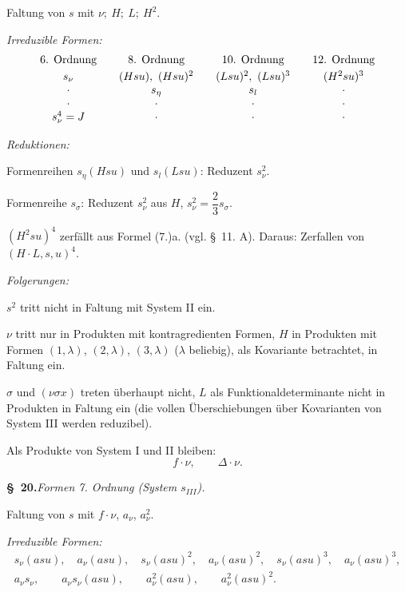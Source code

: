 Faltung von $s$ mit $\nu;\ H;\ L;\ H^2$.

\noindent\emph{Irreduzible Formen:}
\[
\begin{array}{c@{\qquad}c@{\qquad}c@{\qquad}c}
\text{6. Ordnung} & \text{8. Ordnung} & \text{10. Ordnung} & \text{12. Ordnung}\\[0.3em]
s_\nu & (Hsu),\ (Hsu)^2 & (Lsu)^2,\ (Lsu)^3 & (H^2su)^3\\
\cdot & s_\eta & s_l & \cdot\\
\cdot & \cdot & \cdot & \cdot\\
s_\nu^4=J & \cdot & \cdot & \cdot
\end{array}
\]

\noindent\emph{Reduktionen:}

Formenreihen $s_\eta(Hsu)$ und $s_l(Lsu)$: Reduzent $s_\nu^2$.

Formenreihe $s_\sigma$: Reduzent $s_\nu^2$ aus $H$, $s_\nu^2=\dfrac23s_\sigma$.

$(H^2su)^4$ zerfällt aus Formel (7.)a. (vgl. \S\ 11. A). Daraus: Zerfallen von $(H\cdot L,s,u)^4$.

\noindent\emph{Folgerungen:}

$s^2$ tritt nicht in Faltung mit System II ein.

$\nu$ tritt nur in Produkten mit kontragredienten Formen, $H$ in Produkten mit Formen $(1,\lambda)$, $(2,\lambda)$, $(3,\lambda)$ ($\lambda$ beliebig), als Kovariante betrachtet, in Faltung ein.

$\sigma$ und $(\nu\sigma x)$ treten überhaupt nicht, $L$ als Funktionaldeterminante nicht in Produkten in Faltung ein (die vollen Überschiebungen über Kovarianten von System III werden reduzibel).

Als Produkte von System I und II bleiben:
\[
f\cdot \nu,\qquad \Delta\cdot \nu.
\]

\begin{center}
\textbf{\S\ 20.}\quad\emph{Formen 7. Ordnung (System $s_{III}$).}
\end{center}

Faltung von $s$ mit $f\cdot \nu$, $a_\nu$, $a_\nu^2$.

\noindent\emph{Irreduzible Formen:}
\[
\begin{gathered}
s_\nu(asu),\quad a_\nu(asu),\quad s_\nu(asu)^2,\quad a_\nu(asu)^2,\quad
s_\nu(asu)^3,\quad a_\nu(asu)^3,\\
a_\nu s_\nu,\qquad a_\nu s_\nu(asu),\qquad a_\nu^2(asu),\qquad a_\nu^2(asu)^2.
\end{gathered}
\]

